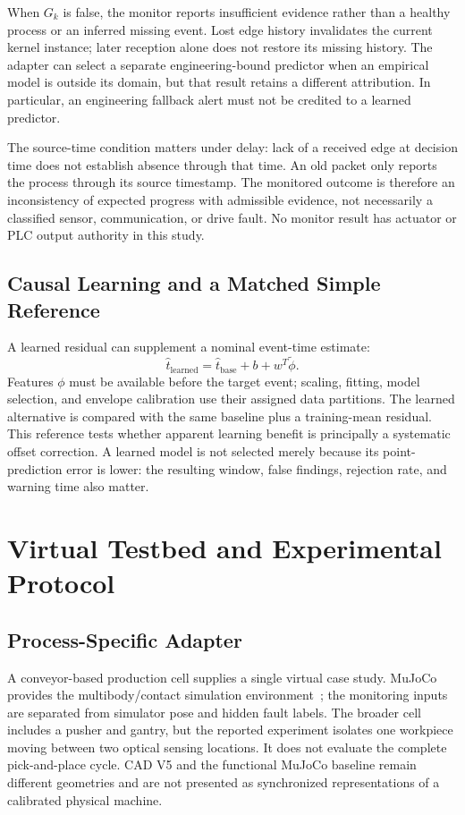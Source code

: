 When $G_k$ is false, the monitor reports insufficient evidence rather than a healthy process or an inferred missing event. Lost edge history invalidates the current kernel instance; later reception alone does not restore its missing history. The adapter can select a separate engineering-bound predictor when an empirical model is outside its domain, but that result retains a different attribution. In particular, an engineering fallback alert must not be credited to a learned predictor.

The source-time condition matters under delay: lack of a received edge at decision time does not establish absence through that time. An old packet only reports the process through its source timestamp. The monitored outcome is therefore an inconsistency of expected progress with admissible evidence, not necessarily a classified sensor, communication, or drive fault. No monitor result has actuator or PLC output authority in this study.

\subsection{Causal Learning and a Matched Simple Reference}
A learned residual can supplement a nominal event-time estimate:
\begin{equation}
 \widehat t_{\mathrm{learned}}=\widehat t_{\mathrm{base}}+b+w^T\widetilde\phi.
\end{equation}
Features $\phi$ must be available before the target event; scaling, fitting, model selection, and envelope calibration use their assigned data partitions. The learned alternative is compared with the same baseline plus a training-mean residual. This reference tests whether apparent learning benefit is principally a systematic offset correction. A learned model is not selected merely because its point-prediction error is lower: the resulting window, false findings, rejection rate, and warning time also matter.

\section{Virtual Testbed and Experimental Protocol}
\subsection{Process-Specific Adapter}
A conveyor-based production cell supplies a single virtual case study. MuJoCo provides the multibody/contact simulation environment~\cite{Todorov2012}; the monitoring inputs are separated from simulator pose and hidden fault labels. The broader cell includes a pusher and gantry, but the reported experiment isolates one workpiece moving between two optical sensing locations. It does not evaluate the complete pick-and-place cycle. CAD V5 and the functional MuJoCo baseline remain different geometries and are not presented as synchronized representations of a calibrated physical machine.

